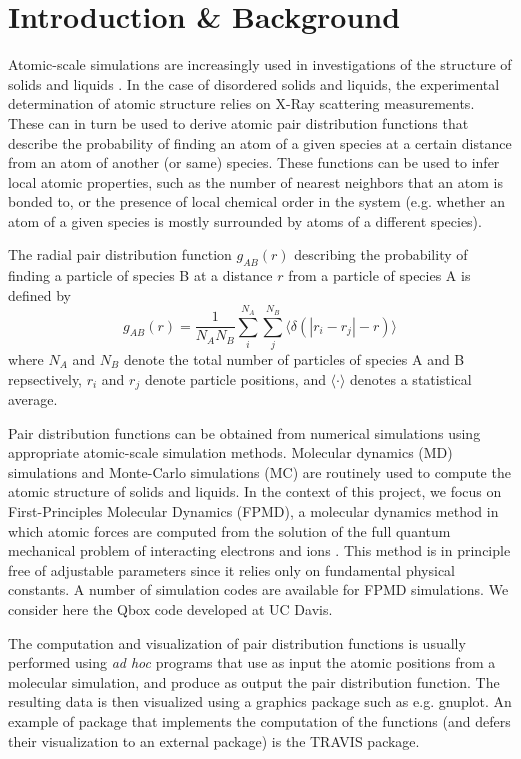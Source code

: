 \section*{Introduction \& Background}
Atomic-scale simulations are increasingly used in investigations of the structure of solids and liquids \cite{Frenkel}. In the case of disordered solids and liquids, the experimental determination of atomic structure relies on X-Ray scattering measurements. These can in turn be used to derive atomic pair distribution functions that describe the probability of finding an atom of a given species at a certain distance from an atom of another (or same) species. These functions can be used to infer local atomic properties, such as the number of nearest neighbors that an atom is bonded to, or the presence of local chemical order in the system (e.g. whether an atom of a given species is mostly surrounded by atoms of a different species).

The radial pair distribution function $g_{AB}(r)$ describing the probability of finding a particle of species B at a distance $r$ from a particle of species A is defined by
\begin{equation}
g_{AB}(r) = \frac{1}{N_A N_B} \sum_i^{N_A} \sum_j^{N_B} \langle \delta(|r_i-r_j|-r) \rangle
\end{equation}
where $N_A$ and $N_B$ denote the total number of particles of species A and B repsectively, $r_i$ and $r_j$ denote particle positions, and $\langle\cdot\rangle$ denotes a statistical average. 

Pair distribution functions can be obtained from numerical simulations using appropriate atomic-scale simulation methods. Molecular dynamics (MD) simulations and Monte-Carlo simulations (MC) are routinely used to compute the atomic structure of solids and liquids. In the context of this project, we focus on First-Principles Molecular Dynamics (FPMD), a molecular dynamics method in which atomic forces are computed from the solution of the full quantum mechanical problem of interacting electrons and ions \cite{CarParrinello}. This method is in principle free of adjustable parameters since it relies only on fundamental physical constants. A number of simulation codes are available for FPMD simulations. We consider here the Qbox code \cite{qboxcode} developed at UC Davis.

The computation and visualization of pair distribution functions is usually performed using {\em ad hoc} programs that use as input the atomic positions from a molecular simulation, and produce as output the pair distribution function. The resulting data is then visualized using a graphics package such as e.g. gnuplot. An example of package that implements the computation of the functions (and defers their visualization to an external package) is the TRAVIS package\cite{travis}. 

